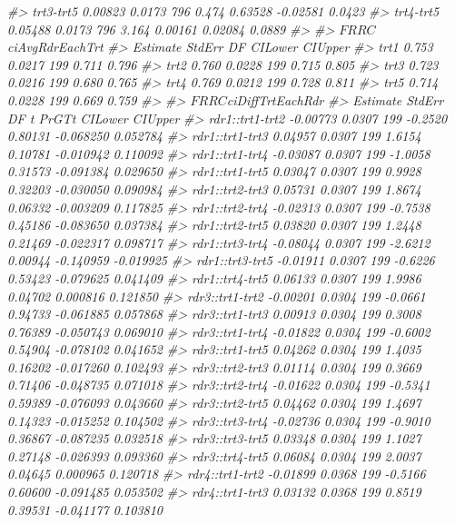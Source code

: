 \documentclass[
]{book}
\newenvironment{Shaded}{\begin{snugshade}}{\end{snugshade}}
\newcommand{\CommentTok}[1]{\textcolor[rgb]{0.56,0.35,0.01}{\textit{#1}}}
\begin{document}
\begin{Shaded}
\begin{Highlighting}[]
\CommentTok{#> trt3-trt5  0.00823 0.0173 796  0.474 0.63528 -0.02581  0.0423}
\CommentTok{#> trt4-trt5  0.05488 0.0173 796  3.164 0.00161  0.02084  0.0889}
\CommentTok{#> }
\CommentTok{#> $FRRC$ciAvgRdrEachTrt}
\CommentTok{#>      Estimate StdErr  DF CILower CIUpper}
\CommentTok{#> trt1    0.753 0.0217 199   0.711   0.796}
\CommentTok{#> trt2    0.760 0.0228 199   0.715   0.805}
\CommentTok{#> trt3    0.723 0.0216 199   0.680   0.765}
\CommentTok{#> trt4    0.769 0.0212 199   0.728   0.811}
\CommentTok{#> trt5    0.714 0.0228 199   0.669   0.759}
\CommentTok{#> }
\CommentTok{#> $FRRC$ciDiffTrtEachRdr}
\CommentTok{#>                 Estimate StdErr  DF       t   PrGTt   CILower   CIUpper}
\CommentTok{#> rdr1::trt1-trt2 -0.00773 0.0307 199 -0.2520 0.80131 -0.068250  0.052784}
\CommentTok{#> rdr1::trt1-trt3  0.04957 0.0307 199  1.6154 0.10781 -0.010942  0.110092}
\CommentTok{#> rdr1::trt1-trt4 -0.03087 0.0307 199 -1.0058 0.31573 -0.091384  0.029650}
\CommentTok{#> rdr1::trt1-trt5  0.03047 0.0307 199  0.9928 0.32203 -0.030050  0.090984}
\CommentTok{#> rdr1::trt2-trt3  0.05731 0.0307 199  1.8674 0.06332 -0.003209  0.117825}
\CommentTok{#> rdr1::trt2-trt4 -0.02313 0.0307 199 -0.7538 0.45186 -0.083650  0.037384}
\CommentTok{#> rdr1::trt2-trt5  0.03820 0.0307 199  1.2448 0.21469 -0.022317  0.098717}
\CommentTok{#> rdr1::trt3-trt4 -0.08044 0.0307 199 -2.6212 0.00944 -0.140959 -0.019925}
\CommentTok{#> rdr1::trt3-trt5 -0.01911 0.0307 199 -0.6226 0.53423 -0.079625  0.041409}
\CommentTok{#> rdr1::trt4-trt5  0.06133 0.0307 199  1.9986 0.04702  0.000816  0.121850}
\CommentTok{#> rdr3::trt1-trt2 -0.00201 0.0304 199 -0.0661 0.94733 -0.061885  0.057868}
\CommentTok{#> rdr3::trt1-trt3  0.00913 0.0304 199  0.3008 0.76389 -0.050743  0.069010}
\CommentTok{#> rdr3::trt1-trt4 -0.01822 0.0304 199 -0.6002 0.54904 -0.078102  0.041652}
\CommentTok{#> rdr3::trt1-trt5  0.04262 0.0304 199  1.4035 0.16202 -0.017260  0.102493}
\CommentTok{#> rdr3::trt2-trt3  0.01114 0.0304 199  0.3669 0.71406 -0.048735  0.071018}
\CommentTok{#> rdr3::trt2-trt4 -0.01622 0.0304 199 -0.5341 0.59389 -0.076093  0.043660}
\CommentTok{#> rdr3::trt2-trt5  0.04462 0.0304 199  1.4697 0.14323 -0.015252  0.104502}
\CommentTok{#> rdr3::trt3-trt4 -0.02736 0.0304 199 -0.9010 0.36867 -0.087235  0.032518}
\CommentTok{#> rdr3::trt3-trt5  0.03348 0.0304 199  1.1027 0.27148 -0.026393  0.093360}
\CommentTok{#> rdr3::trt4-trt5  0.06084 0.0304 199  2.0037 0.04645  0.000965  0.120718}
\CommentTok{#> rdr4::trt1-trt2 -0.01899 0.0368 199 -0.5166 0.60600 -0.091485  0.053502}
\CommentTok{#> rdr4::trt1-trt3  0.03132 0.0368 199  0.8519 0.39531 -0.041177  0.103810}

\end{Highlighting}
\end{Shaded}
\end{document}
